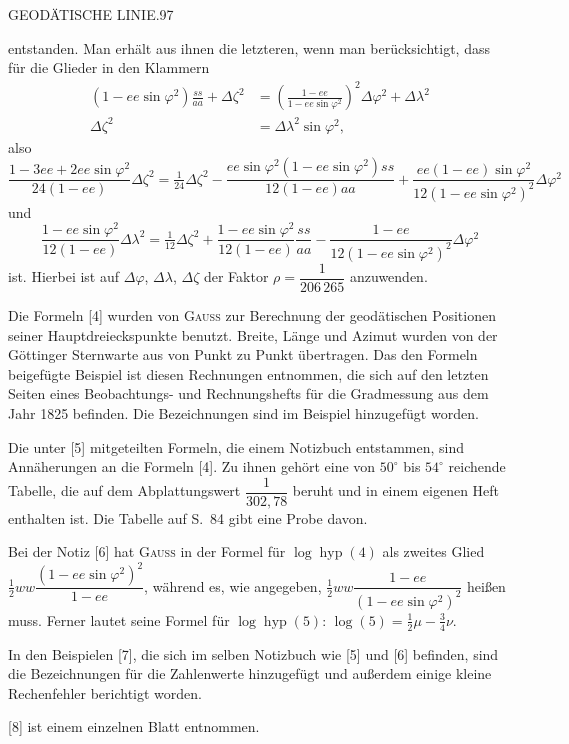 \clearpage
\noindent\mbox{}\hfill GEODÄTISCHE LINIE.\hfill 97\par
{\small
\noindent entstanden. Man erhält aus ihnen die letzteren, wenn man berücksichtigt, dass für die Glieder in den Klammern
\[
\begin{aligned}
(1-ee\sin\varphi^2)\frac{ss}{aa}+\Delta\zeta^2&=\left(\frac{1-ee}{1-ee\sin\varphi^2}\right)^2\Delta\varphi^2+\Delta\lambda^2\\
\Delta\zeta^2&=\Delta\lambda^2\sin\varphi^2,
\end{aligned}
\]
also
\[
\frac{1-3ee+2ee\sin\varphi^2}{24(1-ee)}\Delta\zeta^2=\tfrac1{24}\Delta\zeta^2-\frac{ee\sin\varphi^2(1-ee\sin\varphi^2)ss}{12(1-ee)aa}+\frac{ee(1-ee)\sin\varphi^2}{12(1-ee\sin\varphi^2)^2}\Delta\varphi^2
\]
und
\[
\frac{1-ee\sin\varphi^2}{12(1-ee)}\Delta\lambda^2=\tfrac1{12}\Delta\zeta^2+\frac{1-ee\sin\varphi^2}{12(1-ee)}\frac{ss}{aa}-\frac{1-ee}{12(1-ee\sin\varphi^2)^2}\Delta\varphi^2
\]
ist. Hierbei ist auf $\Delta\varphi$, $\Delta\lambda$, $\Delta\zeta$ der Faktor $\rho=\dfrac1{206\,265}$ anzuwenden.

Die Formeln [4] wurden von \textsc{Gauss} zur Berechnung der geodätischen Positionen seiner Hauptdreieckspunkte benutzt. Breite, Länge und Azimut wurden von der Göttinger Sternwarte aus von Punkt zu Punkt übertragen. Das den Formeln beigefügte Beispiel ist diesen Rechnungen entnommen, die sich auf den letzten Seiten eines Beobachtungs- und Rechnungshefts für die Gradmessung aus dem Jahr 1825 befinden. Die Bezeichnungen sind im Beispiel hinzugefügt worden.

Die unter [5] mitgeteilten Formeln, die einem Notizbuch entstammen, sind Annäherungen an die Formeln [4]. Zu ihnen gehört eine von $50^\circ$ bis $54^\circ$ reichende Tabelle, die auf dem Abplattungswert $\dfrac1{302{,}78}$ beruht und in einem eigenen Heft enthalten ist. Die Tabelle auf S.\ 84 gibt eine Probe davon.

Bei der Notiz [6] hat \textsc{Gauss} in der Formel für $\log\operatorname{hyp}(4)$ als zweites Glied $\tfrac12ww\dfrac{(1-ee\sin\varphi^2)^2}{1-ee}$, während es, wie angegeben, $\tfrac12ww\dfrac{1-ee}{(1-ee\sin\varphi^2)^2}$ heißen muss. Ferner lautet seine Formel für $\log\operatorname{hyp}(5)$: $\log(5)=\tfrac12\mu-\tfrac34\nu$.

In den Beispielen [7], die sich im selben Notizbuch wie [5] und [6] befinden, sind die Bezeichnungen für die Zahlenwerte hinzugefügt und außerdem einige kleine Rechenfehler berichtigt worden.

[8] ist einem einzelnen Blatt entnommen.

}
